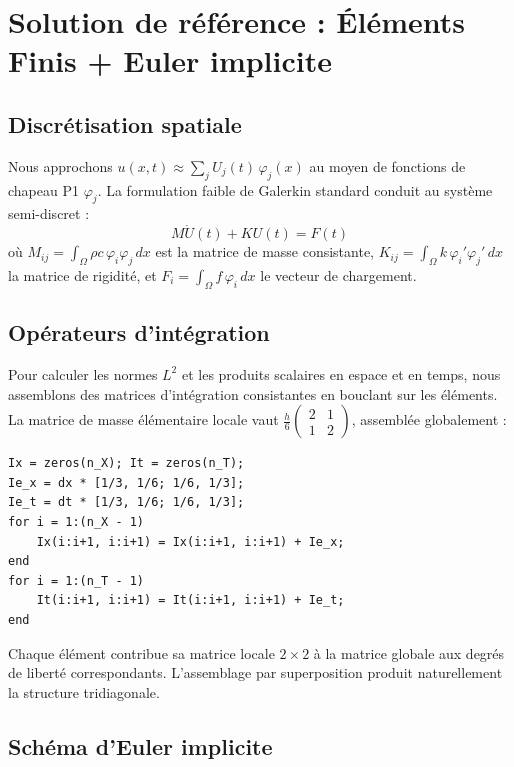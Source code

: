 \documentclass[11pt,a4paper]{article}
\begin{document}
\section{Solution de référence : Éléments Finis + Euler implicite}

\subsection{Discrétisation spatiale}

Nous approchons $u(x,t) \approx \sum_j U_j(t)\,\varphi_j(x)$ au moyen de fonctions
de chapeau P1 $\varphi_j$. La formulation faible de Galerkin standard conduit au système
semi-discret :
\begin{equation}
    M\dot{U}(t) + KU(t) = F(t)
    \label{eq:semidiscrete}
\end{equation}
où $M_{ij} = \int_\Omega \rho c\,\varphi_i\varphi_j\,dx$ est la matrice de masse consistante,
$K_{ij} = \int_\Omega k\,\varphi_i'\varphi_j'\,dx$ la matrice de rigidité,
et $F_i = \int_\Omega f\,\varphi_i\,dx$ le vecteur de chargement.

\subsection{Opérateurs d'intégration}

Pour calculer les normes $L^2$ et les produits scalaires en espace et en temps,
nous assemblons des matrices d'intégration consistantes en bouclant sur les éléments.
La matrice de masse élémentaire locale vaut
$\frac{h}{6}\begin{pmatrix}2&1\\1&2\end{pmatrix}$,
assemblée globalement :
\begin{lstlisting}
Ix = zeros(n_X); It = zeros(n_T);
Ie_x = dx * [1/3, 1/6; 1/6, 1/3];
Ie_t = dt * [1/3, 1/6; 1/6, 1/3];
for i = 1:(n_X - 1)
    Ix(i:i+1, i:i+1) = Ix(i:i+1, i:i+1) + Ie_x;
end
for i = 1:(n_T - 1)
    It(i:i+1, i:i+1) = It(i:i+1, i:i+1) + Ie_t;
end
\end{lstlisting}
Chaque élément contribue sa matrice locale $2\times2$ à la matrice globale aux degrés de liberté
correspondants. L'assemblage par superposition produit naturellement la structure tridiagonale.

\subsection{Schéma d'Euler implicite}
\end{document}
